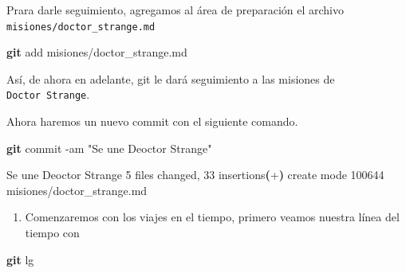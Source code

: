 \documentclass[
]{book}
\newenvironment{Shaded}{\begin{snugshade}}{\end{snugshade}}
\newcommand{\AttributeTok}[1]{\textcolor[rgb]{0.13,0.29,0.53}{#1}}
\newcommand{\ErrorTok}[1]{\textcolor[rgb]{0.64,0.00,0.00}{\textbf{#1}}}
\newcommand{\ExtensionTok}[1]{#1}
\newcommand{\FunctionTok}[1]{\textcolor[rgb]{0.13,0.29,0.53}{\textbf{#1}}}
\newcommand{\KeywordTok}[1]{\textcolor[rgb]{0.13,0.29,0.53}{\textbf{#1}}}
\newcommand{\NormalTok}[1]{#1}
\newcommand{\StringTok}[1]{\textcolor[rgb]{0.31,0.60,0.02}{#1}}
\providecommand{\tightlist}{%
  \setlength{\itemsep}{0pt}\setlength{\parskip}{0pt}}
\begin{document}
Prara darle seguimiento, agregamos al área de preparación el archivo \texttt{misiones/doctor\_strange.md}

\begin{Shaded}
\begin{Highlighting}[]
\FunctionTok{git}\NormalTok{ add misiones/doctor\_strange.md}
\end{Highlighting}
\end{Shaded}

Así, de ahora en adelante, git le dará seguimiento a las misiones de \texttt{Doctor\ Strange}.

Ahora haremos un nuevo commit con el siguiente comando.

\begin{Shaded}
\begin{Highlighting}[]
\FunctionTok{git}\NormalTok{ commit }\AttributeTok{{-}am} \StringTok{"Se une Deoctor Strange"}
\end{Highlighting}
\end{Shaded}

\begin{Shaded}
\begin{Highlighting}[]
\ExtensionTok{[main}\NormalTok{ 9c59afe] Se une Deoctor Strange}
 \ExtensionTok{5}\NormalTok{ files changed, 33 insertions}\ErrorTok{(}\ExtensionTok{+}\KeywordTok{)}
 \ExtensionTok{create}\NormalTok{ mode 100644 misiones/doctor\_strange.md}
\end{Highlighting}
\end{Shaded}

\begin{enumerate}
\def\labelenumi{\arabic{enumi}.}
\setcounter{enumi}{1}
\tightlist
\item
  Comenzaremos con los viajes en el tiempo, primero veamos nuestra línea del tiempo con
\end{enumerate}

\begin{Shaded}
\begin{Highlighting}[]
\FunctionTok{git}\NormalTok{ lg}
\end{Highlighting}
\end{Shaded}
\end{document}
